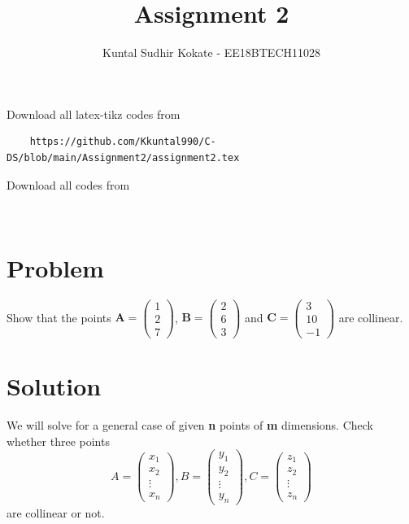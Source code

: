 \documentclass[journal,12pt,twocolumn]{IEEEtran}
\begin{document}
     \def\rightbox#1{\makebox[0in][r]{#1}}
     \def\centbox#1{\makebox[0in]{#1}}
     \def\topbox#1{\raisebox{-\baselineskip}[0in][0in]{#1}}
     \def\midbox#1{\raisebox{-0.5\baselineskip}[0in][0in]{#1}}
\vspace{3cm}
\title{Assignment 2}
\author{Kuntal Sudhir Kokate - EE18BTECH11028}
\maketitle
\newpage
\bigskip
\renewcommand{\thefigure}{\theenumi}
\renewcommand{\thetable}{\theenumi}
Download all latex-tikz codes from 
%
\begin{lstlisting}
    https://github.com/Kkuntal990/C-DS/blob/main/Assignment2/assignment2.tex
\end{lstlisting}

Download all codes from 
\begin{lstlisting}
    
\end{lstlisting}
\section{Problem}
Show that the points $\textbf{A} = \begin{pmatrix} 1 \\ 2 \\ 7 \end{pmatrix}$, $\textbf{B} = \begin{pmatrix} 2 \\ 6 \\ 3 \end{pmatrix}$ and $\textbf{C} = \begin{pmatrix} 3 \\ 10 \\ -1 \end{pmatrix}$ are collinear.
\section{Solution}
We will solve for a general case of given \textbf{n} points of \textbf{m} dimensions.
Check whether three points
\[
    A =
    \begin{pmatrix}
        x_{1}  \\
        x_{2}  \\
        \vdots \\
        x_{n}
    \end{pmatrix},
    B =
    \begin{pmatrix}
        y_{1}  \\
        y_{2}  \\
        \vdots \\
        y_{n}
    \end{pmatrix},
    C =
    \begin{pmatrix}
        z_{1}  \\
        z_{2}  \\
        \vdots \\
        z_{n}
    \end{pmatrix}
\]
are collinear or not.
\end{document}
